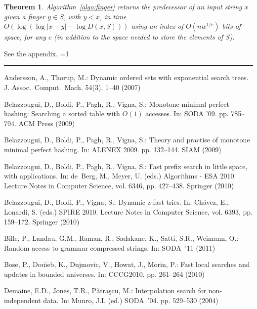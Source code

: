 \documentclass{article}
\newtheorem{theorem}{Theorem}
\newcounter{noqed}
\newcommand{\qed}{ \ifmmode\mbox{ }\fi\rule[-.05em]{.3em}{.7em}\setcounter{noqed}{0}}
\newenvironment{proof}[1][{}]{\noindent{\bf Proof#1. }\setcounter{noqed}{1}}{\ifnum\value{noqed}=1\qed\fi\par\medskip}
\newcommand{\?}{\mskip1.5mu}
\begin{document}
\begin{theorem}
\label{th:finger}
Algorithm~\ref{algo:finger} returns the predecessor of an input string $x$ given
a finger $y\in S$, with $y<x$, in time $O(\log(\log|x-y|-\log D(x,S)))$ using an 
index of $O(n w^{1/c})$ bits 
of space, for any $c$ (in addition to the space needed to store the elements of $S$).
\end{theorem}
\begin{proof}
See the appendix.
\end{proof}

\begin{thebibliography}{10}
\providecommand{\url}[1]{\texttt{#1}}
\providecommand{\urlprefix}{URL }

Andersson, A., Thorup, M.: Dynamic ordered sets with exponential search trees.
  J. Assoc.\ Comput.\ Mach.  54(3), 1--40 (2007)

Belazzougui, D., Boldi, P., Pagh, R., Vigna, S.: Monotone minimal perfect
  hashing: {S}earching a sorted table with {$O(1)$} accesses. In: SODA '09.
  pp. 785--794. ACM Press (2009)

Belazzougui, D., Boldi, P., Pagh, R., Vigna, S.: Theory and practise of
  monotone minimal perfect hashing. In: ALENEX 2009. pp. 132--144. SIAM (2009)

Belazzougui, D., Boldi, P., Pagh, R., Vigna, S.: Fast prefix search in little
  space, with applications. In: de~Berg, M., Meyer, U. (eds.) Algorithms -
  {ESA} 2010. Lecture Notes in Computer Science, vol. 6346,
  pp. 427--438. Springer (2010)

Belazzougui, D., Boldi, P., Vigna, S.: Dynamic z-fast tries. In: Ch{\'a}vez,
  E., Lonardi, S. (eds.) SPIRE 2010. Lecture Notes in Computer Science, vol. 6393, pp.
  159--172. Springer (2010)

Bille, P., Landau, G.M., Raman, R., Sadakane, K., Satti, S.R., Weimann, O.:
  Random access to grammar compressed strings. In: SODA~'11 (2011)

Bose, P., Dou\"{\i}eb, K., Dujmovic, V., Howat, J., Morin, P.: Fast local
  searches and updates in bounded universes. In: CCCG2010. pp. 261--264 (2010)

Demaine, E.D., Jones, T.R., P{\v a}tra{\c s}cu, M.: Interpolation search for
  non-independent data. In: Munro, J.I. (ed.) SODA~'04. pp. 529--530 (2004)


\end{thebibliography}
\end{document}
